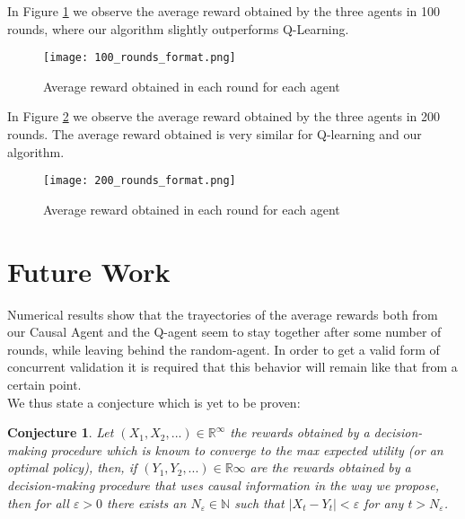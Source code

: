 \documentclass[letterpaper]{article} %
\theoremstyle{plain}
\newtheorem{conj}{Conjecture}
\begin{document}
In Figure \ref{100_rounds} we observe the average reward obtained by the three agents in 100 rounds, where our algorithm slightly outperforms Q-Learning.

\begin{figure}[ht]
\vskip 0.2in
\begin{center}
\centerline{\texttt{[image: 100\_rounds\_format.png]}}
\caption{Average reward obtained in each round for each agent}
\label{100_rounds}
\end{center}
\vskip -0.2in
\end{figure}

In Figure \ref{200_rounds} we observe the average reward obtained by the three agents in 200 rounds. The average reward obtained is very similar for Q-learning and our algorithm.

\begin{figure}[ht]
\vskip 0.2in
\begin{center}
\centerline{\texttt{[image: 200\_rounds\_format.png]}}
\caption{Average reward obtained in each round for each agent}
\label{200_rounds}
\end{center}
\vskip -0.2in
\end{figure}

\section{Future Work}
Numerical results show that the trayectories of the average rewards both from our Causal Agent and the Q-agent seem to stay together after some number of rounds, while leaving behind the random-agent. In order to get a valid form of concurrent validation it is required that this behavior will remain like that from a certain point. \\
We thus state a conjecture which is yet to be proven:
\begin{conj}
Let $(X_1,X_2,...) \in \mathbb{R}^\infty$ the rewards obtained by a decision-making procedure which is known to converge to the max expected utility (or an optimal policy), then, if $(Y_1, Y_2,...) \in \mathbb{R}\infty$ are the rewards obtained by a decision-making procedure that uses causal information in the way we propose, then for all $\varepsilon > 0$ there exists an $N_\varepsilon \in \mathbb{N}$ such that $ | X_t - Y_t | < \varepsilon$ for any $t > N_\varepsilon$. 
\end{conj}
\end{document}
